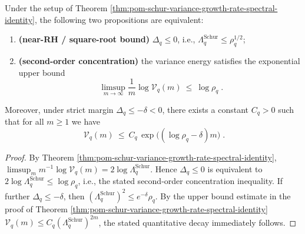 \begin{corollary}\label{cor:pom-schur-near-rh-variance-concentration}
Under the setup of Theorem \ref{thm:pom-schur-variance-growth-rate-spectral-identity}, the following two propositions are equivalent:
\begin{enumerate}
  \item \textbf{(near-RH / square-root bound)} \(\Delta_q\le 0\), i.e., \(\Lambda_q^{\mathrm{Schur}}\le \rho_q^{1/2}\);
  \item \textbf{(second-order concentration)} the variance energy satisfies the exponential upper bound
  \[
  \boxed{\;
  \limsup_{m\to\infty}\frac{1}{m}\log \mathcal V_q(m)\ \le\ \log\rho_q\; }.
  \]
\end{enumerate}
Moreover, under strict margin \(\Delta_q\le-\delta<0\), there exists a constant \(C_q>0\) such that for all \(m\ge 1\) we have
\[
\boxed{\;
\mathcal V_q(m)\ \le\ C_q\,\exp\!\bigl((\log\rho_q-\delta)m\bigr)\; } .
\]
\end{corollary}
\begin{proof}
By Theorem \ref{thm:pom-schur-variance-growth-rate-spectral-identity},
\(
\limsup_m m^{-1}\log\mathcal V_q(m)=2\log\Lambda_q^{\mathrm{Schur}}
\).
Hence \(\Delta_q\le 0\) is equivalent to \(2\log\Lambda_q^{\mathrm{Schur}}\le \log\rho_q\), i.e., the stated second-order concentration inequality.
If further \(\Delta_q\le-\delta\), then \((\Lambda_q^{\mathrm{Schur}})^{2}\le e^{-\delta}\rho_q\).
By the upper bound estimate in the proof of Theorem \ref{thm:pom-schur-variance-growth-rate-spectral-identity}
\(\mathcal V_q(m)\le C_q(\Lambda_q^{\mathrm{Schur}})^{2m}\), the stated quantitative decay immediately follows.
\end{proof}

